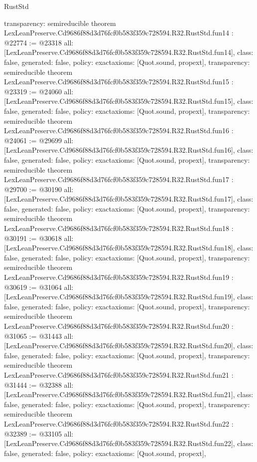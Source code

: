 \begin{lexlean}{RustStd}
\begin{coremodule}
{  transparency: semireducible
}
theorem LexLeanPreserve.Cd9686f88d3d76fcf0b583f359c728594.R32.RustStd.fun14 : @22774 := @23318 {
  all: [LexLeanPreserve.Cd9686f88d3d76fcf0b583f359c728594.R32.RustStd.fun14],
  class: false,
  generated: false,
  policy: exact{axioms: [Quot.sound, propext]},
  transparency: semireducible
}
theorem LexLeanPreserve.Cd9686f88d3d76fcf0b583f359c728594.R32.RustStd.fun15 : @23319 := @24060 {
  all: [LexLeanPreserve.Cd9686f88d3d76fcf0b583f359c728594.R32.RustStd.fun15],
  class: false,
  generated: false,
  policy: exact{axioms: [Quot.sound, propext]},
  transparency: semireducible
}
theorem LexLeanPreserve.Cd9686f88d3d76fcf0b583f359c728594.R32.RustStd.fun16 : @24061 := @29699 {
  all: [LexLeanPreserve.Cd9686f88d3d76fcf0b583f359c728594.R32.RustStd.fun16],
  class: false,
  generated: false,
  policy: exact{axioms: [Quot.sound, propext]},
  transparency: semireducible
}
theorem LexLeanPreserve.Cd9686f88d3d76fcf0b583f359c728594.R32.RustStd.fun17 : @29700 := @30190 {
  all: [LexLeanPreserve.Cd9686f88d3d76fcf0b583f359c728594.R32.RustStd.fun17],
  class: false,
  generated: false,
  policy: exact{axioms: [Quot.sound, propext]},
  transparency: semireducible
}
theorem LexLeanPreserve.Cd9686f88d3d76fcf0b583f359c728594.R32.RustStd.fun18 : @30191 := @30618 {
  all: [LexLeanPreserve.Cd9686f88d3d76fcf0b583f359c728594.R32.RustStd.fun18],
  class: false,
  generated: false,
  policy: exact{axioms: [Quot.sound, propext]},
  transparency: semireducible
}
theorem LexLeanPreserve.Cd9686f88d3d76fcf0b583f359c728594.R32.RustStd.fun19 : @30619 := @31064 {
  all: [LexLeanPreserve.Cd9686f88d3d76fcf0b583f359c728594.R32.RustStd.fun19],
  class: false,
  generated: false,
  policy: exact{axioms: [Quot.sound, propext]},
  transparency: semireducible
}
theorem LexLeanPreserve.Cd9686f88d3d76fcf0b583f359c728594.R32.RustStd.fun20 : @31065 := @31443 {
  all: [LexLeanPreserve.Cd9686f88d3d76fcf0b583f359c728594.R32.RustStd.fun20],
  class: false,
  generated: false,
  policy: exact{axioms: [Quot.sound, propext]},
  transparency: semireducible
}
theorem LexLeanPreserve.Cd9686f88d3d76fcf0b583f359c728594.R32.RustStd.fun21 : @31444 := @32388 {
  all: [LexLeanPreserve.Cd9686f88d3d76fcf0b583f359c728594.R32.RustStd.fun21],
  class: false,
  generated: false,
  policy: exact{axioms: [Quot.sound, propext]},
  transparency: semireducible
}
theorem LexLeanPreserve.Cd9686f88d3d76fcf0b583f359c728594.R32.RustStd.fun22 : @32389 := @33105 {
  all: [LexLeanPreserve.Cd9686f88d3d76fcf0b583f359c728594.R32.RustStd.fun22],
  class: false,
  generated: false,
  policy: exact{axioms: [Quot.sound, propext]},
}
\end{coremodule}
\end{lexlean}
